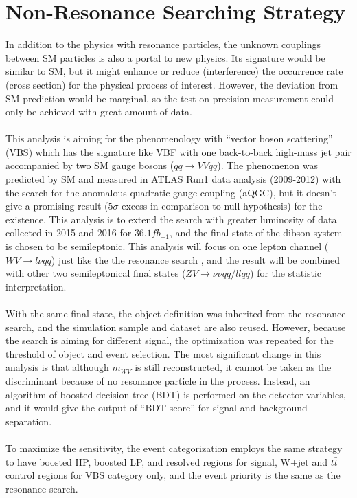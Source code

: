 \chapter{Non-Resonance Searching Strategy}
In addition to the physics with resonance particles, the unknown couplings between SM particles is also a portal to new physics. Its signature would be similar to SM, but it might enhance or reduce (interference) the occurrence rate (cross section) for the physical process of interest. However, the deviation from SM prediction would be marginal, so the test on precision measurement could only be achieved with great amount of data. 
\\
\\This analysis is aiming for the phenomenology with ``vector boson scattering'' (VBS) which has the signature like VBF with one back-to-back high-mass jet pair accompanied by two SM gauge bosons ($qq \to VVqq$). The phenomenon was predicted by SM and measured in ATLAS Run1 data analysis (2009-2012) with the search for the anomalous quadratic gauge coupling (aQGC), but it doesn't give a promising result ($5\sigma$ excess in comparison to null hypothesis) for the existence. This analysis is to extend the search with greater luminosity of data collected in 2015 and 2016 for $36.1fb_{-1}$, and the final state of the dibson system is chosen to be semileptonic.  This analysis will focus on one lepton channel ($WV \to l\nu qq$) just like the the resonance search , and the result will be combined with other two semileptonical final states ($ZV \to \nu\nu qq/llqq$) for the statistic interpretation.
\\
\\With the same final state, the object definition was inherited from the resonance search, and the simulation sample and dataset are also reused. However, because the search is aiming for different signal, the optimization was repeated for the threshold of object and event selection.  The most significant change in this analysis is that although $m_{WV}$ is still reconstructed, it cannot be taken as the discriminant because of no resonance particle in the process. Instead, an algorithm of boosted decision tree (BDT) is performed on the detector variables, and it would give the output of ``BDT score'' for signal and background separation.
\\ 
\\To maximize the sensitivity, the event categorization employs the same strategy to have boosted HP, boosted LP, and resolved regions for signal, W+jet and $t\bar{t}$ control regions for VBS category only, and the event priority is the same as the resonance search.
